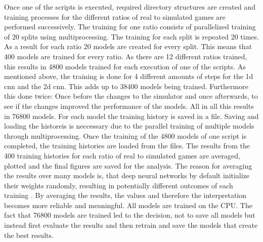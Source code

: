 Once one of the scripts is executed, required directory structures are created and training processes for the different ratios of real to simulated games are performed successively. The training for one ratio consists of parallelized training of 20 splits using multiprocessing. The training for each split is repeated 20 times. As a result for each ratio 20 models are created for every split. This means that 400 models are trained for every ratio. As there are 12 different ratios trained, this results in 4800 models trained for each execution of one of the scripts. As mentioned above, the training is done for 4 different amounts of steps for the 1d cnn and the 2d cnn. This adds up to 38400 models being trained. Furthermore this done twice: Once before the changes to the simulator and once afterwards, to see if the changes improved the performance of the models. All in all this results in 76800 models. For each model the training history is saved in a file. Saving and loading the historeis is neccessary due to the parallel training of multiple models through multiprocessing.  Once the training of the 4800 models of one script is completed, the training histories are loaded from the files. The results from the 400 training histories for each ratio of real to simulated games are averaged, plotted and the final figures are saved for the analysis. The reason for averaging the results over many models is, that deep neural networks by default initialize their weights randomly, resulting in potentially different outcomes of each training . By averaging the results, the values and therefore the interpretation becomes more reliable and meaningful. All models are trained on the CPU. The fact that 76800 models are trained led to the decision, not to save all models but instead first evaluate the results and then retrain and save the models that create the best results. 

